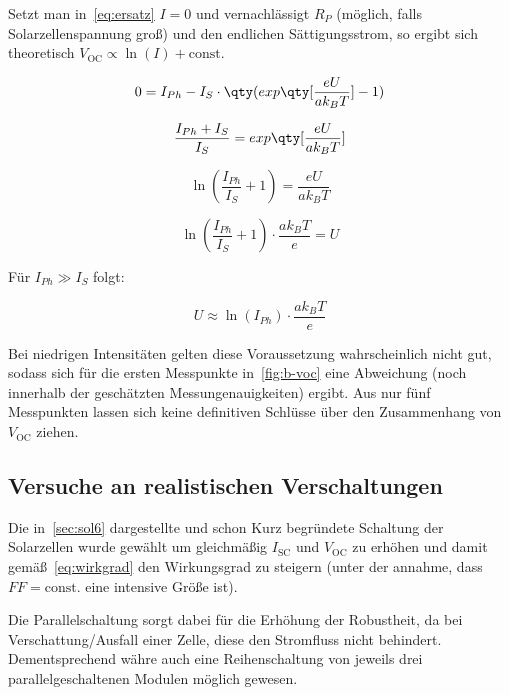 \documentclass[slug=SZ, room=Hermann-Krone-Bau\,\ Labor\ 1.25, supervisor=Martin\ Kroll]{../../Lab_Report_LaTeX/lab_report}
\newcommand{\voc}{V_{\text{OC}}}
\newcommand{\isc}{I_{\text{SC}}}
\begin{document}
Setzt man in~\ref{eq:ersatz} \(I=0\) und vernachl\"assigt \(R_P\)
(m\"oglich, falls Solarzellenspannung gro\ss{}) und den endlichen
S\"attigungsstrom, so ergibt sich theoretisch
\(\voc\propto\ln(I) + \text{const}\).

\begin{equation}
	0 = I_{Ph} - I_S \cdot \qty(exp\qty[\frac{eU}{ak_BT}]-1)
\end{equation}

\begin{equation}
	\frac{I_{Ph}+I_S}{I_S} =  exp\qty[\frac{eU}{ak_BT}]
\end{equation}

\begin{equation}
	\ln(\frac{I_{Ph}}{I_S}+1) = \frac{eU}{ak_BT}
\end{equation}

\begin{equation}
	\ln(\frac{I_{Ph}}{I_S}+1) \cdot \frac{ak_BT}{e} = U
\end{equation}

Für \(I_{Ph} \gg I_S\) folgt:

\begin{equation}\label{eq:iphgross}
	  U \approx \ln(I_{Ph}) \cdot \frac{ak_BT}{e}
\end{equation}

Bei niedrigen
Intensit\"aten gelten diese Voraussetzung wahrscheinlich nicht gut,
sodass sich f\"ur die ersten Messpunkte in~\ref{fig:b-voc} eine
Abweichung (noch innerhalb der gesch\"atzten Messungenauigkeiten)
ergibt. Aus nur f\"unf Messpunkten lassen sich keine definitiven
Schl\"usse \"uber den Zusammenhang von \(\voc\) ziehen.

\subsection{Versuche an realistischen Verschaltungen}
\label{sec:auswc}
Die in~\ref{sec:sol6} dargestellte und schon Kurz begr\"undete
Schaltung der Solarzellen wurde gew\"ahlt um gleichm\"a\ss{}ig
\(\isc\) und \(\voc\) zu erh\"ohen und damit
gem\"a\ss{}~\ref{eq:wirkgrad} den Wirkungsgrad zu steigern (unter der
annahme, dass \(FF=\text{const.}\) eine intensive Gr\"o\ss{}e ist).

Die Parallelschaltung sorgt dabei f\"ur die Erh\"ohung der Robustheit,
da bei Verschattung/Ausfall einer Zelle, diese den Stromfluss nicht
behindert. Dementsprechend w\"ahre auch eine Reihenschaltung von
jeweils drei parallelgeschaltenen Modulen m\"oglich gewesen.
\end{document}
